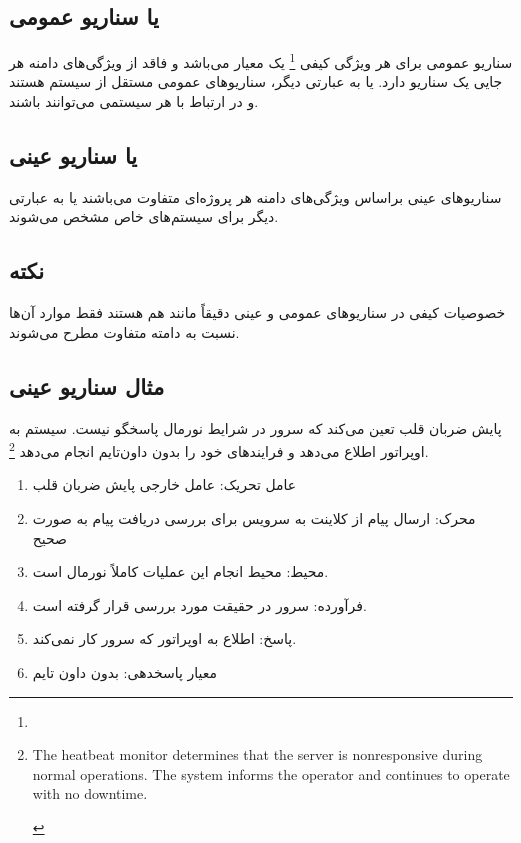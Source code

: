 \subsection{ یا سناریو عمومی}

سناریو عمومی برای هر ویژگی کیفی \footnote{} یک معیار
می‌باشد و فاقد از ویژگی‌های دامنه هر جایی یک سناریو دارد. یا به عبارتی دیگر،
سناریو‌های عمومی مستقل از سیستم هستند و در ارتباط با هر سیستمی می‌توانند باشند.

\subsection{ یا سناریو عینی}

سناریو‌های عینی براساس ویژگی‌های دامنه هر پروژه‌ای متفاوت می‌باشند یا به عبارتی
دیگر برای سیستم‌های خاص مشخص می‌شوند.

\subsection*{نکته}

خصوصیات کیفی در سناریو‌های عمومی و عینی دقیقاً مانند هم هستند فقط موارد‌ آن‌ها
نسبت به دامته متفاوت مطرح می‌شوند.

\subsection{مثال سناریو عینی}

پایش ضربان قلب تعین می‌کند که سرور در شرایط نورمال پاسخگو نیست. سیستم به
اوپراتور اطلاع می‌دهد و فرایند‌های خود را بدون داون‌تایم انجام می‌دهد
\footnote{\begin{LTR}
    The heatbeat monitor determines that the server is nonresponsive during
    normal operations. The system informs the operator and continues to operate
    with no downtime.
\end{LTR}}.

\begin{enumerate}
    \item عامل تحریک: عامل خارجی پایش ضربان قلب
    \item محرک: ارسال پیام از کلاینت به سرویس برای بررسی دریافت پیام به صورت صحیح
    \item محیط: محیط انجام این عملیات کاملاً نورمال است.
    \item فرآورده: سرور در حقیقت مورد بررسی قرار گرفته است.
    \item پاسخ: اطلاع به اوپراتور که سرور کار نمی‌کند.
    \item معیار پاسخدهی: بدون داون تایم
\end{enumerate}

